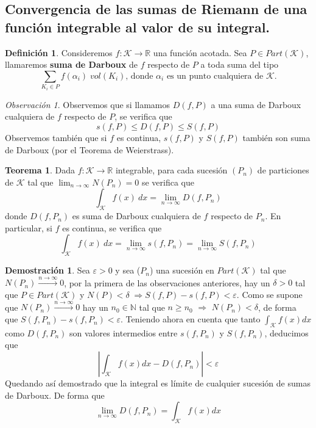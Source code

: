 \documentclass[12pt,twoside]{report}
\newcommand\mc[1]{\mathcal{#1}}
\theoremstyle{azul}
\theoremstyle{azul2}
\theoremstyle{plain}
\theoremstyle{definition}
\newtheorem{defin}{Definición}[chapter]
\newtheorem*{dem}{Demostración}
\newtheorem{teo}{Teorema}[chapter]
\theoremstyle{remark}
\newtheorem*{obs}{Observación}
\begin{document}
\subsection{Convergencia de las sumas de Riemann de una función integrable al valor de su integral.}
\begin{defin} Consideremos $f: \mc{K} \longrightarrow \mathbb{R}$ una función acotada. Sea $P \in Part(\mc{K})$, llamaremos \textbf{suma de Darboux} de $f$ respecto de $P$ a toda suma del tipo 
$$\sum_{K_i \in P} f(\alpha_i) \; vol(K_i) \text{, donde } \alpha_i \text{ es un punto cualquiera de } \mc{K}.$$
\end{defin}
\begin{obs}Observemos que si llamamos $D(f,P)$ a una suma de Darboux cualquiera de $f$ respecto de $P$, se verifica que 
$$s(f,P) \leq D(f,P) \leq S(f,P)$$
Observemos también que si $f$ es continua, $s(f, P)$ y $S(f,P)$ también son suma de Darboux (por el Teorema de Weierstrass).
\end{obs}
\begin{teo}
Dada $f: \mc{K} \longrightarrow \mathbb{R}$ integrable, para cada sucesión $(P_n)$ de particiones de $\mc{K}$ tal que $\lim_{n \to \infty}N(P_n)=0$ se verifica que $$\int_{\mc{K}} f(x) \: dx = \lim_{n \to \infty} D(f, P_n)$$ donde $D(f, P_n)$ es suma de Darboux cualquiera de $f$ respecto de $P_n$. En particular, si $f$ es continua, se verifica que $$\int_{\mc{K}} f(x) \: dx = \lim_{n \to \infty} s(f, P_n) = \lim_{n \to \infty} S(f, P_n)$$
\end{teo}
\begin{dem}
Sea $\varepsilon > 0$ y sea ($P_n$) una sucesión en $Part(\mc{K})$ tal que $N(P_n)\overset{n \to \infty}{\longrightarrow} 0$, por la primera de las observaciones anteriores, hay un $\delta > 0$ tal que $P \in Part(\mc{K})$ y $N(P) < \delta \; \Rightarrow S(f,P) - s(f, P) < \varepsilon$. Como se supone que $N(P_n) \overset{n \to \infty}{\longrightarrow} 0$ hay un $n_0 \in \mathbb{N}$ tal que $n \geq n_0$ $\Rightarrow$ $N(P_n) < \delta$, de forma que $S(f, P_n) - s(f, P_n) < \varepsilon$. Teniendo ahora en cuenta que tanto $\int_{\mc{K}} f(x) dx$ como $D(f, P_n)$ son valores intermedios entre $s(f, P_n)$ y $S(f,P_n)$, deducimos que 
$$\left|\int_{\mc{K}} f(x) dx   - D(f, P_n)  \right| < \varepsilon$$
Quedando así demostrado que la integral es límite de cualquier sucesión de sumas de Darboux. De forma que 
$$\lim_{n \to \infty} D(f, P_n) =  \int_{\mc{K}} f(x) dx $$
\end{dem}
\end{document}
